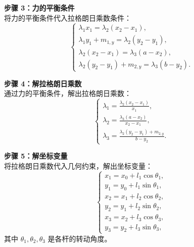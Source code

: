 \documentclass[12pt, a4paper, oneside, UTF8]{ctexbook}  %
\begin{document}
\begin{example}
\begin{solution}
    \noindent \textbf{步骤 3：力的平衡条件} \\
    将力的平衡条件代入拉格朗日乘数条件：
    \[
    \begin{cases}
    \lambda_1 x_1 = \lambda_2 (x_2 - x_1), \\
    \lambda_1 y_1 + m_{1,y} = \lambda_2 (y_2 - y_1), \\
    \lambda_2 (x_2 - x_1) = \lambda_3 (a - x_2), \\
    \lambda_2 (y_2 - y_1) + m_{2,y} = \lambda_3 (b - y_2).
    \end{cases}
    \]
    
    \noindent \textbf{步骤 4：解拉格朗日乘数} \\
    通过力的平衡条件，解出拉格朗日乘数：
    \[
    \begin{cases}
    \lambda_1 = \frac{\lambda_2 (x_2 - x_1)}{x_1}, \\
    \lambda_2 = \frac{\lambda_3 (a - x_2)}{x_2 - x_1}, \\
    \lambda_3 = \frac{\lambda_2 (y_2 - y_1) + m_{2,y}}{b - y_2}.
    \end{cases}
    \]
    
    \noindent \textbf{步骤 5：解坐标变量} \\
    将拉格朗日乘数代入几何约束，解出坐标变量：
    \[
    \begin{cases}
    x_1 = x_0 + l_1 \cos \theta_1, \\
    y_1 = y_0 + l_1 \sin \theta_1, \\
    x_2 = x_1 + l_2 \cos \theta_2, \\
    y_2 = y_1 + l_2 \sin \theta_2, \\
    x_3 = x_2 + l_3 \cos \theta_3, \\
    y_3 = y_2 + l_3 \sin \theta_3,
    \end{cases}
    \]
    其中 \( \theta_1, \theta_2, \theta_3 \) 是各杆的转动角度。
\end{solution}
\end{example}
\end{document}

